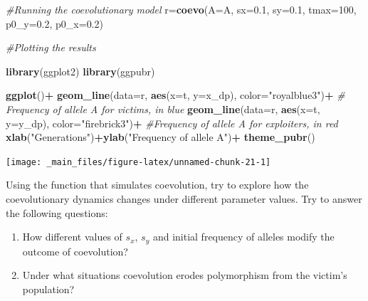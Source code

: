 \documentclass[
]{book}
\newenvironment{Shaded}{\begin{snugshade}}{\end{snugshade}}
\newcommand{\AttributeTok}[1]{\textcolor[rgb]{0.13,0.29,0.53}{#1}}
\newcommand{\CommentTok}[1]{\textcolor[rgb]{0.56,0.35,0.01}{\textit{#1}}}
\newcommand{\DecValTok}[1]{\textcolor[rgb]{0.00,0.00,0.81}{#1}}
\newcommand{\FloatTok}[1]{\textcolor[rgb]{0.00,0.00,0.81}{#1}}
\newcommand{\FunctionTok}[1]{\textcolor[rgb]{0.13,0.29,0.53}{\textbf{#1}}}
\newcommand{\NormalTok}[1]{#1}
\newcommand{\OtherTok}[1]{\textcolor[rgb]{0.56,0.35,0.01}{#1}}
\newcommand{\SpecialCharTok}[1]{\textcolor[rgb]{0.81,0.36,0.00}{\textbf{#1}}}
\newcommand{\StringTok}[1]{\textcolor[rgb]{0.31,0.60,0.02}{#1}}
\providecommand{\tightlist}{%
  \setlength{\itemsep}{0pt}\setlength{\parskip}{0pt}}
\begin{document}
\begin{Shaded}
\begin{Highlighting}[]
\CommentTok{\#Running the coevolutionary model}
\NormalTok{r}\OtherTok{=}\FunctionTok{coevo}\NormalTok{(}\AttributeTok{A=}\NormalTok{A, }\AttributeTok{sx=}\FloatTok{0.1}\NormalTok{, }\AttributeTok{sy=}\FloatTok{0.1}\NormalTok{, }\AttributeTok{tmax=}\DecValTok{100}\NormalTok{, }\AttributeTok{p0\_y=}\FloatTok{0.2}\NormalTok{, }\AttributeTok{p0\_x=}\FloatTok{0.2}\NormalTok{)}

\CommentTok{\#Plotting the results}

\FunctionTok{library}\NormalTok{(ggplot2)}
\FunctionTok{library}\NormalTok{(ggpubr)}

\FunctionTok{ggplot}\NormalTok{()}\SpecialCharTok{+}
  \FunctionTok{geom\_line}\NormalTok{(}\AttributeTok{data=}\NormalTok{r, }\FunctionTok{aes}\NormalTok{(}\AttributeTok{x=}\NormalTok{t, }\AttributeTok{y=}\NormalTok{x\_dp), }\AttributeTok{color=}\StringTok{"royalblue3"}\NormalTok{)}\SpecialCharTok{+} \CommentTok{\# Frequency of allele A for victims, in blue}
  \FunctionTok{geom\_line}\NormalTok{(}\AttributeTok{data=}\NormalTok{r, }\FunctionTok{aes}\NormalTok{(}\AttributeTok{x=}\NormalTok{t, }\AttributeTok{y=}\NormalTok{y\_dp), }\AttributeTok{color=}\StringTok{"firebrick3"}\NormalTok{)}\SpecialCharTok{+} \CommentTok{\#Frequency of allele A for exploiters, in red}
  \FunctionTok{xlab}\NormalTok{(}\StringTok{"Generations"}\NormalTok{)}\SpecialCharTok{+}\FunctionTok{ylab}\NormalTok{(}\StringTok{"Frequency of allele A"}\NormalTok{)}\SpecialCharTok{+}
  \FunctionTok{theme\_pubr}\NormalTok{()}
\end{Highlighting}
\end{Shaded}

\texttt{[image: \_main\_files/figure-latex/unnamed-chunk-21-1]}

Using the function that simulates coevolution, try to explore how the coevolutionary dynamics changes under different parameter values. Try to answer the following questions:

\begin{enumerate}
\def\labelenumi{\arabic{enumi}.}
\tightlist
\item
  How different values of \(s_{x}\), \(s_{y}\) and initial frequency of alleles modify the outcome of coevolution?
\item
  Under what situations coevolution erodes polymorphism from the victim's population?
\end{enumerate}
\end{document}
